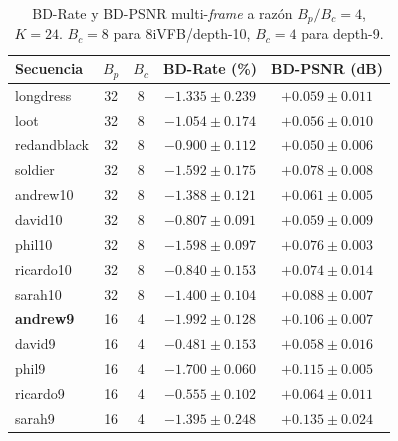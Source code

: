         \begin{table}[H]
            \centering
            \caption{BD-Rate y BD-PSNR multi-\textit{frame} a razón $B_p/B_c=4$, $K=24$. $B_c=8$
            para 8iVFB/depth-10, $B_c=4$ para depth-9.}
            \small
            \begin{tabular}{l|c|c|c|c}
                \hline
                \textbf{Secuencia} & $B_p$ & $B_c$ & \textbf{BD-Rate (\%)} & \textbf{BD-PSNR (dB)} \\
                \hline
                longdress & 32 & 8 & $-1.335 \pm 0.239$ & $+0.059 \pm 0.011$ \\
                loot & 32 & 8 & $-1.054 \pm 0.174$ & $+0.056 \pm 0.010$ \\
                redandblack & 32 & 8 & $-0.900 \pm 0.112$ & $+0.050 \pm 0.006$ \\
                soldier & 32 & 8 & $-1.592 \pm 0.175$ & $+0.078 \pm 0.008$ \\
                andrew10 & 32 & 8 & $-1.388 \pm 0.121$ & $+0.061 \pm 0.005$ \\
                david10 & 32 & 8 & $-0.807 \pm 0.091$ & $+0.059 \pm 0.009$ \\
                phil10 & 32 & 8 & $-1.598 \pm 0.097$ & $+0.076 \pm 0.003$ \\
                ricardo10 & 32 & 8 & $-0.840 \pm 0.153$ & $+0.074 \pm 0.014$ \\
                sarah10 & 32 & 8 & $-1.400 \pm 0.104$ & $+0.088 \pm 0.007$ \\
                \textbf{andrew9} & 16 & 4 & $\mathbf{-1.992 \pm 0.128}$ & $\mathbf{+0.106 \pm 0.007}$ \\
                david9 & 16 & 4 & $-0.481 \pm 0.153$ & $+0.058 \pm 0.016$ \\
                phil9 & 16 & 4 & $-1.700 \pm 0.060$ & $+0.115 \pm 0.005$ \\
                ricardo9 & 16 & 4 & $-0.555 \pm 0.102$ & $+0.064 \pm 0.011$ \\
                sarah9 & 16 & 4 & $-1.395 \pm 0.248$ & $+0.135 \pm 0.024$ \\
                \hline
            \end{tabular}
            \label{tab:e10_bd_ratio4}
        \end{table}

